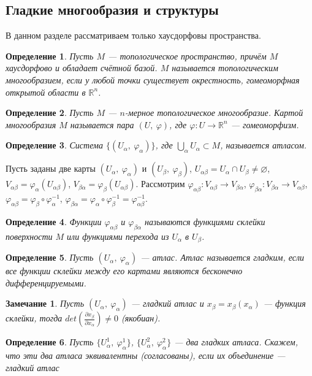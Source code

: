 \documentclass[12pt]{article}
\theoremstyle{plain}
\newtheorem{definition}{Определение}[section]
\newtheorem{remark}{Замечание}
\newcommand{\R}{\mathbb R}
\renewcommand{\phi}{\varphi}
\begin{document}
    \subsection{Гладкие многообразия и структуры}
    В данном разделе рассматриваем только хаусдорфовы пространства.
    \begin{definition}
        Пусть $M$ --- топологическое пространство, причём $M$ хаусдорфово и обладает счётной базой. $M$ называется топологическим многообразием, если у любой точки существует окрестность, гомеоморфная открытой области в $\R^n$.
    \end{definition}
    \begin{definition}
        Пусть $M$ --- $n$-мерное топологическое многообразие. Картой многообразия $M$ называется пара $(U, \ \phi)$, где $\phi:U\to\R^n$ --- гомеоморфизм.
    \end{definition}
    \begin{definition}
        Система $\{(U_{\alpha}, \ \phi_{\alpha})\}$, где $\bigcup\limits_{\alpha}U_{\alpha}\subset M$, называется атласом.
    \end{definition}
    Пусть заданы две карты $(U_{\alpha}, \ \phi_{\alpha})$ и $(U_{\beta}, \ \phi_{\beta})$, $U_{\alpha\beta}=U_{\alpha}\cap U_{\beta}\neq\varnothing$, $V_{\alpha\beta}=\phi_{\alpha}(U_{\alpha\beta})$, $V_{\beta\alpha}=\phi_{\beta}(U_{\alpha\beta})$. Рассмотрим $\phi_{\alpha\beta}:V_{\alpha\beta}\to V_{\beta\alpha}$, $\phi_{\beta\alpha}:V_{\beta\alpha}\to V_{\alpha\beta}$, $\phi_{\alpha\beta}=\phi_{\beta}\circ\phi_{\alpha}^{-1}$, $\phi_{\beta\alpha}=\phi_{\alpha}\circ\phi_{\beta}^{-1}=\phi_{\alpha\beta}^{-1}$.
    \begin{definition}
        Функции $\phi_{\alpha\beta}$ и $\phi_{\beta\alpha}$ называются функциями склейки поверхности $M$ или функциями перехода из $U_{\alpha}$ в $U_{\beta}$.
    \end{definition}
    \begin{definition}
        Пусть $(U_{\alpha}, \ \phi_{\alpha})$ --- атлас. Атлас называется гладким, если все функции склейки между его картами являются бесконечно дифференцируемыми.
    \end{definition}
    \begin{remark}
        Пусть $(U_{\alpha}, \ \phi_{\alpha})$ --- гладкий атлас и $x_{\beta}=x_{\beta}(x_{\alpha})$ --- функция склейки, тогда $det\left(\frac{\partial x_{\beta}}{\partial x_{\alpha}}\right)\neq0$ (якобиан).
    \end{remark}
    \begin{definition}
        Пусть $\{U^1_{\alpha}, \ \phi^1_{\alpha}\}$, $\{U^2_{\alpha}, \ \phi^2_{\alpha}\}$ --- два гладких атласа. Скажем, что эти два атласа эквивалентны (согласованы), если их объединение --- гладкий атлас
    \end{definition}
\end{document}

